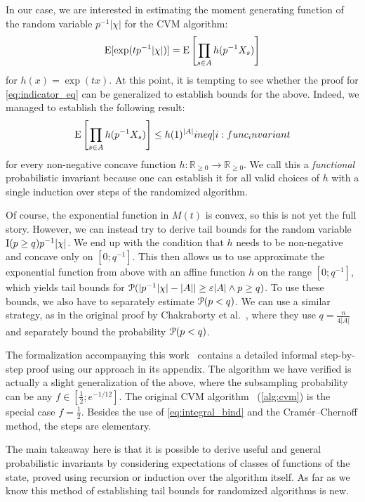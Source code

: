 In our case, we are interested in estimating the moment generating function of the random variable $p^{-1} |\chi|$ for the CVM algorithm:
\[
  \operatorname{\mathrm{E}} [\exp( t p^{-1} |\chi| )] = \operatorname{\mathrm{E}} \left[ \prod_{s \in A} h(p^{-1} X_s) \right]
\]
for $h(x) = \exp(tx)$.
At this point, it is tempting to see whether the proof for \cref{eq:indicator_eq} can be generalized to establish bounds for the above.
Indeed, we managed to establish the following result:
\begin{align}
  \expect \left[ \prod_{s \in A} h(p^{-1} X_s) \right] \leq h(1)^{|A|} \label[ineq]{i:func_invariant}
\end{align}
for every non-negative concave function $h : \mathbb R_{\geq 0} \rightarrow \mathbb R_{\geq 0}$.
We call this a \emph{functional} probabilistic invariant because one can establish it for all valid choices of $h$ with a single induction over steps of the randomized algorithm.

Of course, the exponential function in $M(t)$ is convex, so this is not yet the full story.
However, we can instead try to derive tail bounds for the random variable $\operatorname{\mathrm{I}}(p \geq q) p^{-1} |\chi|$.
We end up with the condition that $h$ needs to be non-negative and concave only on $[0;q^{-1}]$.
This then allows us to use approximate the exponential function from above with an affine function $h$ on the range $[0;q^{-1}]$, which yields tail bounds for $\operatorname{\mathcal P}( |p^{-1} |\chi| - |A|| \geq \varepsilon |A| \wedge p \geq q)$.
To use these bounds, we also have to separately estimate $\operatorname{\mathcal P}(p < q)$.
We can use a similar strategy, as in the original proof by Chakraborty et al.~\cite{chakraborty2022}, where they use $q = \frac{n}{4 |A|}$ and separately bound the probability $\operatorname{\mathcal P}(p < q)$.

The formalization accompanying this work~\todo{[cite]} contains a detailed informal step-by-step proof using our approach in its appendix.
The algorithm we have verified is actually a slight generalization of the above, where the subsampling probability can be any $f \in [\frac{1}{2};e^{-1/12}]$.
The original CVM algorithm~\cite{chakraborty2022} (\cref{alg:cvm}) is the special case $f=\frac{1}{2}$.
Besides the use of \cref{eq:integral_bind} and the Cram\'er--Chernoff method, the steps are elementary.

The main takeaway here is that it is possible to derive useful and general probabilistic invariants by considering expectations of classes of functions of the state, proved using recursion or induction over the algorithm itself.
As far as we know this method of establishing tail bounds for randomized algorithms is new.


